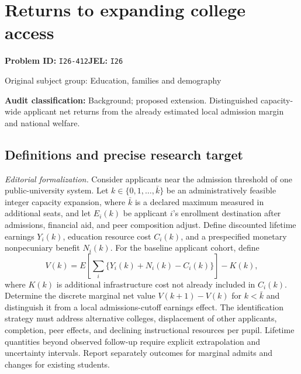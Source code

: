 \documentclass[11pt,a4paper]{article}
\begin{document}
\section*{Returns to expanding college access}
\textbf{Problem ID:} \texttt{I26-412}\quad \textbf{JEL:} \texttt{I26}\par
\label{problem:OP-0454}
{\sffamily\small\color{muted}Original subject group: Education, families and demography\par}
\label{definitions:problem:30007736}
\textbf{Audit classification:} Background; proposed extension. Distinguished capacity-wide applicant net returns from the already estimated local admission margin and national welfare.
\subsection*{Definitions and precise research target}
\textit{Editorial formalization.} Consider applicants near the admission threshold of one public-university system. Let \(k\in\{0,1,\ldots,\bar k\}\) be an administratively feasible integer capacity expansion, where \(\bar k\) is a declared maximum measured in additional seats, and let \(E_i(k)\) be applicant \(i\)'s enrollment destination after admissions, financial aid, and peer composition adjust. Define discounted lifetime earnings \(Y_i(k)\), education resource cost \(C_i(k)\), and a prespecified monetary nonpecuniary benefit \(N_i(k)\). For the baseline applicant cohort, define
\[V(k)=E\!\left[\sum_i\{Y_i(k)+N_i(k)-C_i(k)\}\right]-K(k),\]
where \(K(k)\) is additional infrastructure cost not already included in \(C_i(k)\). Determine the discrete marginal net value \(V(k+1)-V(k)\) for \(k<\bar k\) and distinguish it from a local admissions-cutoff earnings effect. The identification strategy must address alternative colleges, displacement of other applicants, completion, peer effects, and declining instructional resources per pupil. Lifetime quantities beyond observed follow-up require explicit extrapolation and uncertainty intervals. Report separately outcomes for marginal admits and changes for existing students.
\end{document}
